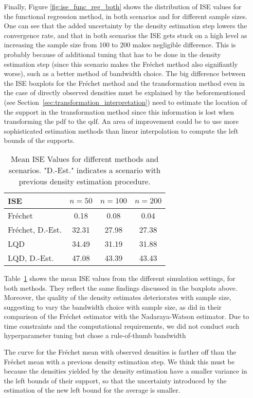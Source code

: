 Finally, Figure \ref{fig:ise_func_reg_both} shows the distribution of ISE values for
the functional regression method, in both scenarios and for different sample sizes. One
can see that the added uncertainty by the density estimation step lowers the convergence
rate, and that in both scenarios the ISE gets stuck on a high level as increasing the
sample size from 100 to 200 makes negligible difference. This is probably
because of additional tuning that has to be done in the density estimation step (since
this scenario makes the Fréchet method also signifiantly worse), such as a better method
of bandwidth choice. The big difference between the ISE boxplots for the Fréchet method and
the transformation method even in the case of directly observed densities must be explained
by the beforementioned (see Section~\ref{sec:transformation_interpretation}) need to
estimate the location of the support in the transformation method since this information
is lost when transforming the pdf to the qdf. An area of improvement could be to use
more sophisticated estimation methods than linear interpolation to compute the left bounds
of the supports.

\begin{table}[h!]
    \centering
    \begin{tabular}{lccc}
        \hline
        ISE & $n = 50$ & $n = 100$ & $n = 200$ \\
        \hline
        Fréchet             & 0.18 & 0.08 & 0.04 \\
        Fréchet, D.-Est.    & 32.31 & 27.98 & 27.38 \\
        LQD                 & 34.49 & 31.19 & 31.88 \\
        LQD, D.-Est.        & 47.08 & 43.39 & 43.43 \\
        \hline
    \end{tabular}
    \caption{Mean ISE Values for different methods and scenarios. "D.-Est." indicates
    a scenario with previous density estimation procedure.}
    \label{tab:mean_ise_values}
\end{table}
Table~\ref{tab:mean_ise_values} shows the mean ISE values from the different simulation
settings, for both methods. They reflect the same findings discussed in the boxplots
above.
Moreover, the quality of the density estimates deteriorates with sample size, suggesting
to vary the bandwidth choice with sample size, as \textcite{PetersenMüller2019} did in
their comparison of the Fréchet estimator with the Nadaraya-Watson estimator. Due to
time constraints and the computational requirements, we did not conduct such
hyperparameter tuning but chose a rule-of-thumb bandwidth
\parencites[Chapter~3.4.1]{Silverman1986}[Chapter~2.2.1]{LiRacine2007}

The curve for the Fréchet mean with observed densities is farther off than the Fréchet
mean with a previous density estimation step. We think this must be because the densities
yielded by the density estimation have a smaller variance in the left bounds of their
support, so that the uncertainty introduced by the estimation of the new left bound for
the average is smaller.
